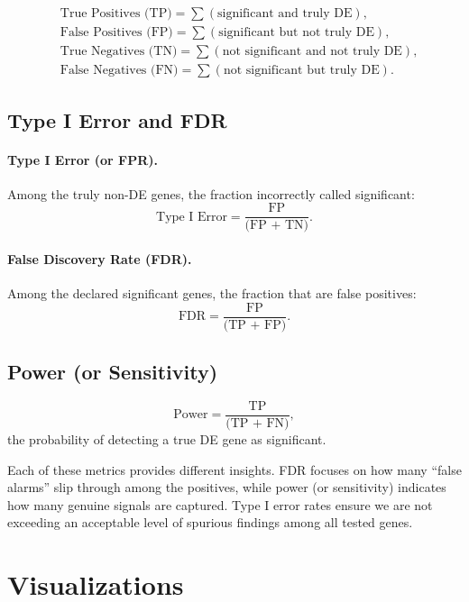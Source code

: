 \documentclass[12pt]{article}
\begin{document}
\[
\begin{aligned}
&\text{True Positives (TP)} = \sum (\text{significant and truly DE}),\\
&\text{False Positives (FP)} = \sum (\text{significant but not truly DE}),\\
&\text{True Negatives (TN)} = \sum (\text{not significant and not truly DE}),\\
&\text{False Negatives (FN)} = \sum (\text{not significant but truly DE}).
\end{aligned}
\]

\subsection{Type I Error and FDR}

\paragraph{Type I Error (or FPR).} Among the truly non-DE genes, the fraction incorrectly called significant:
\[
\text{Type I Error} = \frac{\text{FP}}{\text{(FP + TN)}}.
\]

\paragraph{False Discovery Rate (FDR).} Among the declared significant genes, the fraction that are false positives:
\[
\text{FDR} = \frac{\text{FP}}{\text{(TP + FP)}}.
\]

\subsection{Power (or Sensitivity)}
\[
\text{Power} = \frac{\text{TP}}{\text{(TP + FN)}},
\]
the probability of detecting a true DE gene as significant.

Each of these metrics provides different insights. FDR focuses on how many “false alarms” slip through among the positives, while power (or sensitivity) indicates how many genuine signals are captured. Type I error rates ensure we are not exceeding an acceptable level of spurious findings among all tested genes.

\section{Visualizations}
\label{sec:viz}
\end{document}
